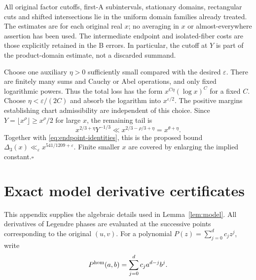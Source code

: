 \documentclass[11pt,a4paper]{article}
\numberwithin{equation}{section}
\theoremstyle{remark}
\newcommand{\eps}{\varepsilon}
\begin{document}
All original factor cutoffs, first-A subintervals, stationary domains,
rectangular cuts and shifted intersections lie in the uniform domain
families already treated. The estimates are for each original real $x$;
no averaging in $x$ or almost-everywhere assertion has been used. The
intermediate endpoint and isolated-fiber costs are those explicitly
retained in the B errors. In particular, the cutoff at $Y$ is part of
the product-domain estimate, not a discarded summand.

Choose one auxiliary $\eta>0$ sufficiently small compared with the desired
$\eps$. There are finitely many sums and Cauchy or Abel operations, and
only fixed logarithmic powers. Thus the total loss has the form
$x^{C\eta}(\log x)^C$ for a fixed $C$. Choose $\eta<\eps/(2C)$ and absorb
the logarithm into $x^{\eps/2}$. The positive margins establishing chart
admissibility are independent of this choice. Since
$Y=\lfloor x^\rho\rfloor\ge x^\rho/2$ for large $x$, the remaining tail is
\[
 x^{2/3+\eta}Y^{-1/3}
 \ll x^{2/3-\rho/3+\eta}=x^{\theta+\eta}.
\]
Together with \eqref{eq:endpoint-identities}, this is the proposed bound
$\Delta_3(x)\ll_\eps x^{541/1209+\eps}$. Finite smaller $x$ are covered by
enlarging the implied constant.\hfill$\square$

\appendix
\section{Exact model derivative certificates}
\label{app:model}
This appendix supplies the algebraic details used in
Lemma~\ref{lem:model}. All derivatives of Legendre phases are evaluated
at the successive points corresponding to the original $(u,v)$.
For a polynomial $P(z)=\sum_{j=0}^d c_jz^j$, write
\[
 P^{\rm hom}(a,b)=\sum_{j=0}^d c_j a^{d-j}b^j.
\]
\end{document}
